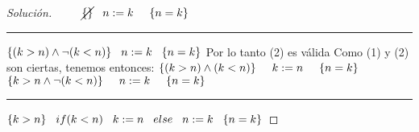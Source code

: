 \begin{proof}[Solución]
\newline
$ \hspace*{0.8cm} \cancel{\{ \}} \hspace*{0.3cm} n:=k \hspace*{.5cm} \{n=k\}$
\newline
\noindent\rule{6.5cm}{0.4pt}
\newline
$ \{(k>n) \wedge \neg(k<n) \} \hspace*{0.3cm}  n:=k \hspace*{0.3cm} \{n=k \}$
\vspace*{0.3cm}
\newline
Por lo tanto (2) es válida
\newline
Como (1) y (2) son ciertas, tenemos entonces:
\vspace*{0.3cm}
\newline
$\{(k>n) \wedge (k<n) \} \hspace*{0.5cm}  k:=n \hspace*{.5cm} \{n=k \} $
\newline
$\{k>n \wedge \neg (k<n) \} \hspace*{.5cm}  n:=k \hspace*{.5cm} \{n=k \} $
\newline
\noindent\rule{9cm}{0.4pt}
\newline
$ \{k > n\} \hspace*{.3cm} if (k < n) \hspace*{.3cm} k := n \hspace*{.3cm} else \hspace*{.3cm} n:= k \hspace*{.3cm} \{n = k\} $
\end{proof}
